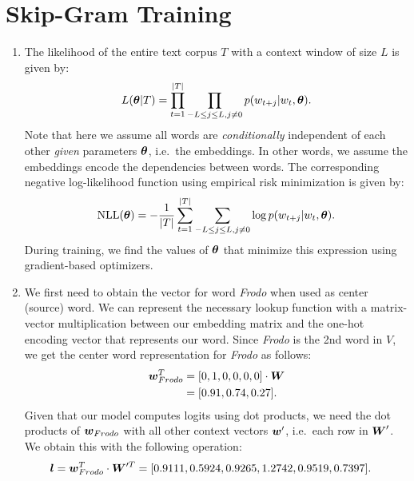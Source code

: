 \documentclass[11pt,a4paper]{article}
\begin{document}
\section{Skip-Gram Training}

\begin{enumerate}[label=(\alph*)]
    \item The likelihood of the entire text corpus $T$ with a context window of
          size $L$ is given by:
          \begin{align*}
              L({\boldsymbol{\theta}}|T) = \prod_{t=1}^{|T|}\prod_{-L\leq j\leq L, j\neq 0} p(w_{t+j}|w_t,{\boldsymbol{\theta}}).
          \end{align*}
          Note that here we assume all words are \emph{conditionally}
          independent of each other \emph{given} parameters ${\boldsymbol{\theta}}$, i.e.\ the
          embeddings.
          In other words, we assume the embeddings encode the dependencies
          between words.
          The corresponding negative log-likelihood function using empirical
          risk minimization is given by:
          \begin{align*}
              \text{NLL}({\boldsymbol{\theta}}) = - \frac{1}{|T|} \sum_{t=1}^{|T|} \sum_{-L\leq j\leq L, j\neq 0} \log p(w_{t+j}|w_t,{\boldsymbol{\theta}}).
          \end{align*}
          During training, we find the values of ${\boldsymbol{\theta}}$ that minimize this
          expression using gradient-based optimizers.
    \item We first need to obtain the vector for word \textit{Frodo} when used
          as center (source) word.
          We can represent the necessary lookup function with a matrix-vector
          multiplication between our embedding matrix and the one-hot encoding
          vector that represents our word.
          Since \textit{Frodo} is the 2nd word in $V$, we get the center word
          representation for \textit{Frodo} as follows:
          \begin{align*}
              {\boldsymbol{w}}_{Frodo}^T & = [0, 1, 0, 0, 0, 0] \cdot {\boldsymbol{W}} \\
                            & = [0.91, 0.74, 0.27].
          \end{align*}
          Given that our model computes logits using dot products, we need the
          dot products of ${\boldsymbol{w}}_{Frodo}$ with all other context vectors ${\boldsymbol{w}}'$,
          i.e.\ each row in ${\boldsymbol{W}}'$.
          We obtain this with the following operation:
          \begin{align*}
              \vl = \vw_{Frodo}^T\cdot \mW'^T & = [0.9111, 0.5924, 0.9265, 1.2742, 0.9519, 0.7397].

\end{align*}
\end{enumerate}
\end{document}
